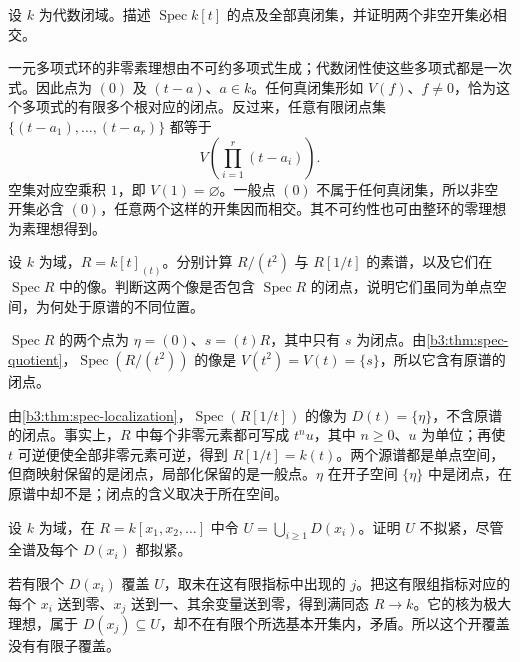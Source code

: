 \begin{exercise}\label{b3:ex:01-affine-line-spectrum}
	设 \(k\) 为代数闭域。描述 \(\operatorname{Spec}k[t]\) 的点及全部真闭集，并证明两个非空开集必相交。
\end{exercise}
\begin{solution}
	一元多项式环的非零素理想由不可约多项式生成；代数闭性使这些多项式都是一次式。因此点为 \((0)\) 及 \((t-a)\)、\(a\in k\)。任何真闭集形如 \(V(f)\)、\(f\ne0\)，恰为这个多项式的有限多个根对应的闭点。反过来，任意有限闭点集 \(\{(t-a_1),\ldots,(t-a_r)\}\) 都等于
	\[
		V\!\left(\prod_{i=1}^{r}(t-a_i)\right).
	\]
	空集对应空乘积 \(1\)，即 \(V(1)=\varnothing\)。一般点 \((0)\) 不属于任何真闭集，所以非空开集必含 \((0)\)，任意两个这样的开集因而相交。其不可约性也可由整环的零理想为素理想得到。
\end{solution}

\begin{exercise}\label{b3:ex:01-local-open-no-closed-point}
	设 \(k\) 为域，\(R=k[t]_{(t)}\)。分别计算 \(R/(t^2)\) 与 \(R[1/t]\) 的素谱，以及它们在 \(\operatorname{Spec}R\) 中的像。判断这两个像是否包含 \(\operatorname{Spec}R\) 的闭点，说明它们虽同为单点空间，为何处于原谱的不同位置。
\end{exercise}
\begin{solution}
	\(\operatorname{Spec}R\) 的两个点为 \(\eta=(0)\)、\(s=(t)R\)，其中只有 \(s\) 为闭点。由\cref{b3:thm:spec-quotient}，\(\operatorname{Spec}(R/(t^2))\) 的像是 \(V(t^2)=V(t)=\{s\}\)，所以它含有原谱的闭点。

	由\cref{b3:thm:spec-localization}，\(\operatorname{Spec}(R[1/t])\) 的像为 \(D(t)=\{\eta\}\)，不含原谱的闭点。事实上，\(R\) 中每个非零元素都可写成 \(t^n u\)，其中 \(n\ge0\)、\(u\) 为单位；再使 \(t\) 可逆便使全部非零元素可逆，得到 \(R[1/t]=k(t)\)。两个源谱都是单点空间，但商映射保留的是闭点，局部化保留的是一般点。\(\eta\) 在开子空间 \(\{\eta\}\) 中是闭点，在原谱中却不是；闭点的含义取决于所在空间。
\end{solution}

\begin{exercise}\label{b3:ex:01-nonquasicompact-open}
	设 \(k\) 为域，在 \(R=k[x_1,x_2,\ldots]\) 中令 \(U=\bigcup_{i\ge1}D(x_i)\)。证明 \(U\) 不拟紧，尽管全谱及每个 \(D(x_i)\) 都拟紧。
\end{exercise}
\begin{solution}
	若有限个 \(D(x_i)\) 覆盖 \(U\)，取未在这有限指标中出现的 \(j\)。把这有限组指标对应的每个 \(x_i\) 送到零、\(x_j\) 送到一、其余变量送到零，得到满同态 \(R\rightarrow k\)。它的核为极大理想，属于 \(D(x_j)\subseteq U\)，却不在有限个所选基本开集内，矛盾。所以这个开覆盖没有有限子覆盖。
\end{solution}

